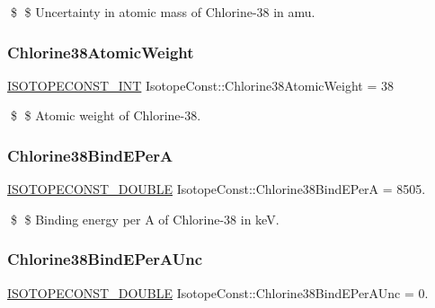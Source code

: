 \$ \$ Uncertainty in atomic mass of Chlorine-\/38 in amu. \mbox{\label{group___isotope_const-_chlorine-_cl38_ga256c0b755596f68913fc60b9ac8f3b21}} 
\subsubsection{\texorpdfstring{Chlorine38\+Atomic\+Weight}{Chlorine38AtomicWeight}}
{\footnotesize\ttfamily \mbox{\hyperlink{group___isotope_const-_macros_ga5f18360b3e99483a35c32d789e62621c}{I\+S\+O\+T\+O\+P\+E\+C\+O\+N\+S\+T\+\_\+\+I\+NT}} Isotope\+Const\+::\+Chlorine38\+Atomic\+Weight = 38}

\$ \$ Atomic weight of Chlorine-\/38. \mbox{\label{group___isotope_const-_chlorine-_cl38_ga0526efd64b7d51007ffe785e3aad86a9}} 
\subsubsection{\texorpdfstring{Chlorine38\+Bind\+E\+PerA}{Chlorine38BindEPerA}}
{\footnotesize\ttfamily \mbox{\hyperlink{group___isotope_const-_macros_ga8f45a7272ce02c0b4c65c44636ed719a}{I\+S\+O\+T\+O\+P\+E\+C\+O\+N\+S\+T\+\_\+\+D\+O\+U\+B\+LE}} Isotope\+Const\+::\+Chlorine38\+Bind\+E\+PerA = 8505.}

\$ \$ Binding energy per A of Chlorine-\/38 in keV. \mbox{\label{group___isotope_const-_chlorine-_cl38_ga5e9764bf16a36bf23b9b8ca4a99e3e37}} 
\subsubsection{\texorpdfstring{Chlorine38\+Bind\+E\+Per\+A\+Unc}{Chlorine38BindEPerAUnc}}
{\footnotesize\ttfamily \mbox{\hyperlink{group___isotope_const-_macros_ga8f45a7272ce02c0b4c65c44636ed719a}{I\+S\+O\+T\+O\+P\+E\+C\+O\+N\+S\+T\+\_\+\+D\+O\+U\+B\+LE}} Isotope\+Const\+::\+Chlorine38\+Bind\+E\+Per\+A\+Unc = 0.}


